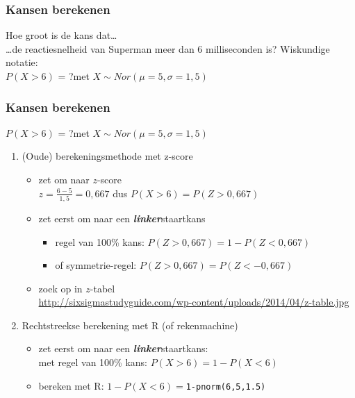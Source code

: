 \documentclass{beamer}
\begin{document}
\begin{frame}
\frametitle{Kansen berekenen}
Hoe groot is de kans dat\dots\\
\dots de reactiesnelheid van Superman meer dan 6 milliseconden is?
\vfill
Wiskundige notatie:\\
\hspace{1cm}$P( X > 6)$ = ?\hspace{1cm}met $X \sim Nor(\mu=5,\sigma=1,5)$
\vfill
{}
\end{frame}

\begin{frame}
\frametitle{Kansen berekenen}
$P( X > 6)$ = ?\hspace{1cm}met $X \sim Nor(\mu=5,\sigma=1,5)$
\vfill
\begin{enumerate}
  \item (Oude) berekeningsmethode met z-score
  \begin{itemize}
    \pause
    \item zet om naar $z$-score\\
    $z=\frac{6-5}{1,5}=0,667$ dus $P(X>6) = P(Z>0,667)$
    \item zet eerst om naar een \textbf{\textit{linker}}staartkans
    \begin{itemize}
       \item regel van 100\% kans: $P(Z>0,667)=1-P(Z<0,667)$
       \item of symmetrie-regel: $P(Z>0,667)=P(Z<-0,667)$
    \end{itemize}
    \item zoek op in $z$-tabel\\
    \url{http://sixsigmastudyguide.com/wp-content/uploads/2014/04/z-table.jpg}
  \end{itemize}
\vfill
  \item Rechtstreekse berekening met R (of rekenmachine)
  \begin{itemize}
  \pause
  \item zet eerst om naar een \textbf{\textit{linker}}staartkans:\\
  met regel van 100\% kans: $P(X>6)=1-P(X<6)$
  \item bereken met R: $1-P(X<6)=$\texttt{1-pnorm(6,5,1.5)}
\end{itemize}
\end{enumerate}
\end{frame}
\end{document}

